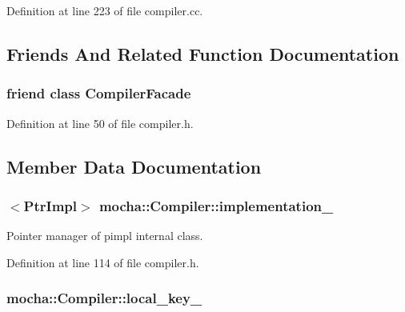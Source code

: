Definition at line 223 of file compiler.cc.



\subsection{Friends And Related Function Documentation}
\hypertarget{classmocha_1_1_compiler_ac8fa258798a4ab4930132157e7c70c0c}{
\subsubsection[{CompilerFacade}]{\setlength{\rightskip}{0pt plus 5cm}friend class {\bf CompilerFacade}}}
\label{classmocha_1_1_compiler_ac8fa258798a4ab4930132157e7c70c0c}


Definition at line 50 of file compiler.h.



\subsection{Member Data Documentation}
\hypertarget{classmocha_1_1_compiler_a5054f7154cef5bf6e452c1e8448e933f}{
\subsubsection[{implementation\_\-}]{$<${\bf PtrImpl}$>$ {\bf mocha::Compiler::implementation\_\-}}}
\label{classmocha_1_1_compiler_a5054f7154cef5bf6e452c1e8448e933f}


Pointer manager of pimpl internal class. 



Definition at line 114 of file compiler.h.

\hypertarget{classmocha_1_1_compiler_a1bd5df1002de299a4a4fad5f133292f7}{
\subsubsection[{local\_\-key\_\-}]{ {\bf mocha::Compiler::local\_\-key\_\-}}}
\label{classmocha_1_1_compiler_a1bd5df1002de299a4a4fad5f133292f7}


